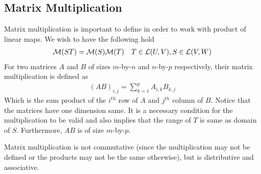 \documentclass[../../linear_algebra.tex]{subfiles}
\begin{document}
\subsection{Matrix Multiplication}
Matrix multiplication is important to define in order to work with product of linear maps. We wish to have the following hold
\begin{align*}
    \mathcal{M}(ST) = \mathcal{M}(S) \mathcal{M}(T) \quad T \in \mathcal{L}(U, V), S \in \mathcal{L}(V, W)
\end{align*}
For two matrices $A$ and $B$ of sizes $m$-by-$n$ and $n$-by-$p$ respectively, their matrix multiplication is defined as
\begin{align*}
    (AB)_{i,j} = \sum_{k=1}^{p} A_{i,k}B_{k,j}
\end{align*}
Which is the sum product of the $i^{th}$ row of $A$ and $j^{th}$ column of $B$. Notice that the matrices have one dimension same. It is a necessary condition for the multiplication to be valid and also implies that the range of $T$ is same as domain of $S$. Furthermore, $AB$ is of size $m$-by-$p$.\newline

Matrix multiplication is not commutative (since the multiplication may not be defined or the products may not be the same otherwise), but is distributive and associative.
\end{document}
